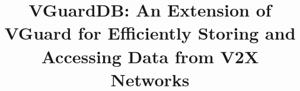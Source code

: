 \usepackage{filecontents}
\newcommand{\para}[1]{\vspace{0.4em}\noindent {\bf #1}}



\title{VGuardDB: An Extension of VGuard for Efficiently Storing and Accessing Data from V2X Networks}

\maketitle


